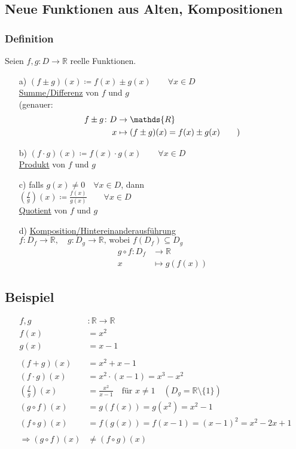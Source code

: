\documentclass[12pt, titlepage]{article}
\newcommand{\R}{\mathds{R}}
\renewcommand{\>}{\rightarrow}
\renewcommand{\*}{\cdot}
\begin{document}
	\subsection{Neue Funktionen aus Alten, Kompositionen}
	\subsubsection*{Definition}
	Seien $f,g\colon D\> \R$ reelle Funktionen.
	\begin{itemize}
		\item[a)] $(f\pm g)(x)\coloneqq f(x)\pm g(x)\qquad \forall x\in D$\\
				  \underline{Summe/Differenz} von $f$ und $g$\\
				  (genauer:\vspace{-0.5cm} \begin{align*}
				  	f\pm g\colon D&\> \R\\
				  	x&\mapsto (f\pm g)(x)=f(x)\pm g(x) \textrm{\qquad )}\end{align*}
		\item[b)] $(f\* g)(x)\coloneqq f(x)\* g(x)\qquad \forall x\in D$\\
		\underline{Produkt} von $f$ und $g$
		\item[c)] falls $g(x)\neq 0\quad \forall x\in D$, dann\\
		$(\frac{f}{g})(x)\coloneqq\frac{f(x)}{g(x)}\qquad \forall x\in D$\\
		\underline{Quotient} von $f$ und $g$
		\item[d)] \underline{Komposition/Hintereinanderausführung}\\
		$f\colon D_f\> \R,\quad g\colon D_g\>\R\textrm{, wobei } f(D_f)\subseteq D_g$\\
		\vspace{-0.5cm}\begin{align*}
			g\circ f\colon D_f&\>\R\\
			x&\mapsto g(f(x))
		\end{align*}
	\end{itemize}
	\subsection{Beispiel}
	\begin{align*}
		f,g&\colon \R\>\R\\
		f(x)&=x^2\\
		g(x)&=x-1\\
		\\
		(f+g)(x)&=x^2+x-1\\
		(f\* g)(x)&=x^2\* (x-1)=x^3-x^2\\
		(\frac{f}{g})(x)&=\frac{x^2}{x-1}\quad\textrm{für }x\neq 1\quad (D_g=\R\setminus \{1\})\\
		(g\circ f)(x)&=g(f(x))=g(x^2)=x^2-1\\
		(f\circ g)(x)&=f(g(x))=f(x-1)=(x-1)^2=x^2-2x+1\\
		\\
		\Rightarrow (g\circ f)(x)&\neq (f\circ g)(x)
	\end{align*}
\end{document}
